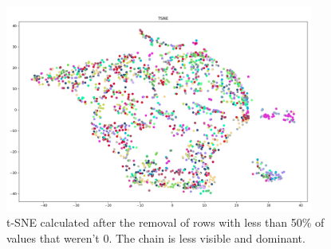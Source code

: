\begin{figure}[h]
  \centering
  \includegraphics[width=0.9\textwidth]{./images/tsneAfterChainRemoved(50Percent).png}
  \caption{t-SNE calculated after the removal of rows with less than 50\% of values that weren't 0. The chain is less visible and dominant.}
  \label{figure:tsneAfterChainRemoved(50Percent)}
\end{figure}








